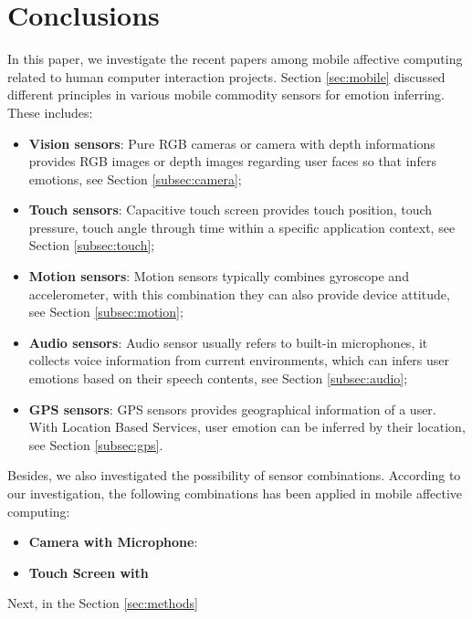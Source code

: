 \section{Conclusions}
In this paper, we investigate the recent papers among mobile affective computing related to human computer interaction projects. Section \ref{sec:mobile} discussed different principles in various mobile commodity sensors for emotion inferring.
These includes:
\begin{itemize}
  \item \textbf{Vision sensors}: Pure RGB cameras or camera with depth informations provides RGB images or depth images regarding user faces so that infers emotions, see Section \ref{subsec:camera};
  \item \textbf{Touch sensors}: Capacitive touch screen provides touch position, touch pressure, touch angle through time within a specific application context, see Section \ref{subsec:touch};
  \item \textbf{Motion sensors}: Motion sensors typically combines gyroscope and accelerometer, with this combination they can also provide device attitude, see Section \ref{subsec:motion};
  \item \textbf{Audio sensors}: Audio sensor usually refers to built-in microphones, it collects voice information from current environments, which can infers user emotions based on their speech contents, see Section \ref{subsec:audio};
  \item \textbf{GPS sensors}: GPS sensors provides geographical information of a user. With Location Based Services, user emotion can be inferred by their location, see Section \ref{subsec:gps}.
\end{itemize}
Besides, we also investigated the possibility of sensor combinations. According to our investigation, the following combinations has been applied in mobile affective computing:
\begin{itemize}
  \item \textbf{Camera with Microphone}:
  \item \textbf{Touch Screen with }
\end{itemize}
Next, in the Section \ref{sec:methods}


